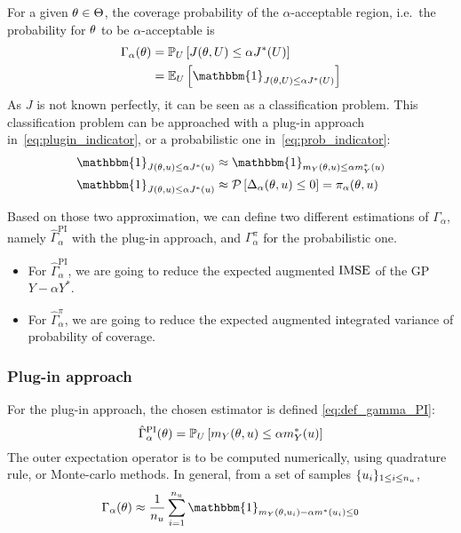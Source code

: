\documentclass[../../Main_ManuscritThese.tex]{subfiles}
\begin{document}
For a given $\theta\in\Theta$, the coverage probability of the $\alpha$-acceptable region, i.e.\ the probability for $\theta$ to be $\alpha$-acceptable is
\begin{align}
  \Gamma_{\alpha}(\kk) &= \Prob_{U}\left[J(\kk,\UU) \leq \alpha J^*(\UU)\right] \\
                              & =\Ex_{U}\left[\mathbbm{1}_{J(\kk,\UU) \leq \alpha J^*(\UU)}\right]
\end{align}
As $J$ is not known perfectly, it can be seen as a classification problem.
This classification problem can be approached with a plug-in approach in~\cref{eq:plugin_indicator}, or a probabilistic one in~\cref{eq:prob_indicator}:
\begin{align}
  \mathbbm{1}_{J(\kk,\uu) \leq \alpha J^*(\uu)} &\approx   \mathbbm{1}_{m_Y(\kk,\uu) \leq \alpha m_Y^*(\uu)} \label{eq:plugin_indicator} \\
  \mathbbm{1}_{J(\kk,\uu) \leq \alpha J^*(\uu)} &\approx   \ProbGP\left[ \Delta_{\alpha}(\kk,\uu) \leq 0 \right] = \pi_{\alpha}(\kk,\uu) \label{eq:prob_indicator}
\end{align}

Based on those two approximation, we can define two different estimations of $\Gamma_\alpha$, namely $\hat{\Gamma}_\alpha^{\mathrm{PI}}$ with the plug-in approach, and $\Gamma_{\alpha}^{\pi}$ for the probabilistic one.
\begin{itemize}
\item For $\hat{\Gamma}_{\alpha}^{\mathrm{PI}}$, we are going to reduce the expected augmented $\operatorname{\mathrm{IMSE}}$ of the GP $Y - \alpha Y^*$.
\item For $\hat{\Gamma}_{\alpha}^{\pi}$, we are going to reduce the expected augmented integrated variance of probability of coverage.
\end{itemize}

\subsubsection{Plug-in approach}
For the plug-in approach, the chosen estimator is defined \cref{eq:def_gamma_PI}:
  \begin{equation}
    \label{eq:def_gamma_PI}
    \hat{\Gamma}_{\alpha}^{\mathrm{PI}}(\theta) = \mathbb{P}_U\left[m_Y(\theta,u) \leq \alpha m_Y^*(u) \right]
  \end{equation}
  The outer expectation operator is to be computed numerically, using quadrature rule, or Monte-carlo methods. In general, from a set of samples $\{u_i\}_{1\leq i \leq n_{u}}$,
  \begin{equation}
    \Gamma_{\alpha}(\kk) \approx \frac{1}{n_{\uu}}\sum_{i=1}^{n_{\uu}} \mathbbm{1}_{m_Y(\kk, \uu_i) - \alpha m^*(\uu_i)\leq 0}
  \end{equation}
\end{document}
